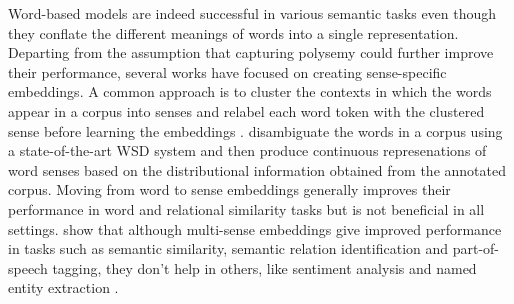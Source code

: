 \documentclass[11pt]{article}
\begin{document}
Word-based models are indeed  successful in various semantic tasks even though they conflate the different meanings of words into a single representation. Departing from the assumption that capturing polysemy %
could further improve their performance, several works have focused on creating sense-specific embeddings. %
A common approach is to cluster the contexts in which the words appear in a corpus into senses %
and relabel each word token with the clustered sense before learning the embeddings  \cite{reisinger-mooney:2010:NAACLHLT,huang-EtAl:2012:ACL20122}. %
 disambiguate the words in a corpus using a state-of-the-art WSD system and then produce continuous represenations of word senses based on the distributional information obtained from the annotated corpus. %
Moving from word to sense embeddings generally improves their performance in word and relational similarity tasks but is not beneficial in all settings. 
 show that although multi-sense embeddings give improved performance in tasks such as semantic similarity, semantic relation identification and part-of-speech tagging, they don't help in others, like sentiment analysis and named entity extraction \cite{li-jurafsky:2015:EMNLP}. %
\end{document}
